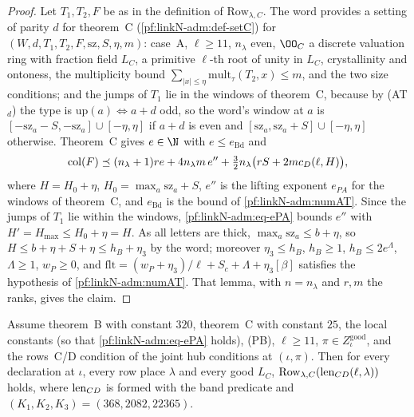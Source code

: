 \begin{proof}
Let $T_1,T_2,F$ be as in the definition of $\mathrm{Row}_{\lambda,C}$. The word provides a setting of parity $d$ for theorem~C (\cref{pf:linkN-adm:def-setC}) for
$(W,d,T_1,T_2,F,\mathrm{sz},S,\eta,m)$: case~A, $\ell\ge11$, $n_\lambda$ even, $\OO_C$ a discrete valuation ring with fraction
field $L_C$, a primitive $\ell$-th root of unity in $L_C$, crystallinity and ontoness, the multiplicity bound
$\sum_{|x|\le\eta}\mathrm{mult}_\tau(T_2,x)\le m$, and the two size conditions; and the jumps of $T_1$ lie in the windows
of theorem~C, because by (AT$_d$) the type is $\mathrm{up}(a)\Leftrightarrow a+d$ odd, so the word's window at $a$
is $[-\mathrm{sz}_a-S,-\mathrm{sz}_a]\cup[-\eta,\eta]$ if $a+d$ is even and $[\mathrm{sz}_a,\mathrm{sz}_a+S]\cup[-\eta,\eta]$
otherwise. Theorem~C gives $e\in\N$ with $e\le e_{\mathrm{Bd}}$ and
\[
\operatorname{col}(F)\preceq(n_\lambda+1)re+4n_\lambda m\,e''+\tfrac32n_\lambda\bigl(rS+2mc_D(\ell,H)\bigr),
\]
where $H=H_0+\eta$, $H_0=\max_a\mathrm{sz}_a+S$, $e''$ is the lifting exponent $e_{PA}$ for the windows of theorem~C, and
$e_{\mathrm{Bd}}$ is the bound of \cref{pf:linkN-adm:numAT}. Since the jumps of $T_1$ lie within the windows,
\eqref{pf:linkN-adm:eq-ePA} bounds $e''$ with $H'=H_{\max}\le H_0+\eta=H$. As all letters are thick,
$\max_a\mathrm{sz}_a\le b+\eta$, so $H\le b+\eta+S+\eta\le h_B+\eta_3$ by the word; moreover $\eta_3\le h_B$, $h_B\ge1$,
$h_B\le2e^\Lambda$, $\Lambda\ge1$, $w_P\ge0$, and $\mathrm{flt}=(w_P+\eta_3)/\ell+S_c+\Lambda+\eta_3[\beta]$ satisfies the
hypothesis of \cref{pf:linkN-adm:numAT}. That lemma, with $n=n_\lambda$ and $r,m$ the ranks, gives the claim.
\end{proof}

\begin{proposition}\label{pf:linkN-adm:rowCD}
Assume theorem~B with constant $320$, theorem~C with constant $25$, the local constants (so that
\eqref{pf:linkN-adm:eq-ePA} holds), (PB), $\ell\ge11$, $\pi\in
Z^{\mathrm{good}}_\iota$, and the rows~C/D condition of the joint hub conditions at $(\iota,\pi)$. Then for every declaration
at $\iota$, every row place $\lambda$ and every good $L_C$, $\mathrm{Row}_{\lambda,C}(\operatorname{len}_{CD}(\ell,\lambda))$
holds, where
$\operatorname{len}_{CD}$ is formed with the band predicate and $(K_1,K_2,K_3)=(368,2082,22365)$.
\end{proposition}

